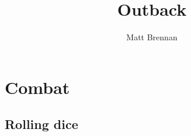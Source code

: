 \documentclass[10pt, a4paper, twocolumn]{book}
\title{Outback}
\author{Matt Brennan}
\date{}
\begin{document}
\maketitle
\tableofcontents

\chapter{Combat}
\lipsum[1]

\section{Rolling dice}
\lipsum
\end{document}
